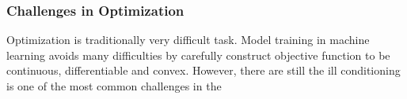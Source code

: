 \subsubsection{Challenges in Optimization}

Optimization is traditionally very difficult task. Model training in machine learning avoids many difficulties by carefully construct objective function to be continuous, differentiable and convex. However, there are still 
the ill conditioning is one of the most common challenges in the 